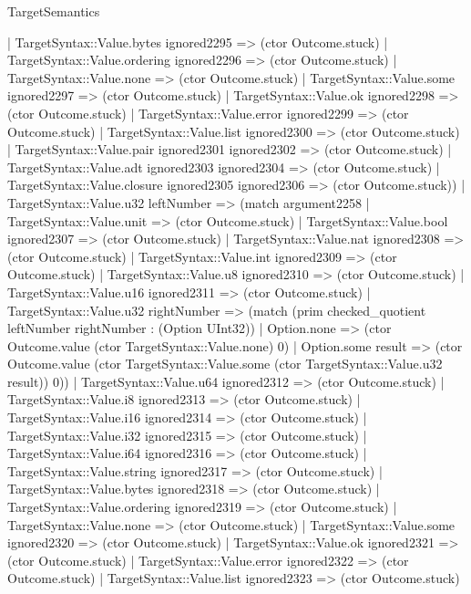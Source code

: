 \begin{lexlean}{TargetSemantics}
\begin{semanticmodule}
{              | TargetSyntax::Value.bytes ignored2295 => (ctor Outcome.stuck)
              | TargetSyntax::Value.ordering ignored2296 => (ctor Outcome.stuck)
              | TargetSyntax::Value.none => (ctor Outcome.stuck)
              | TargetSyntax::Value.some ignored2297 => (ctor Outcome.stuck)
              | TargetSyntax::Value.ok ignored2298 => (ctor Outcome.stuck)
              | TargetSyntax::Value.error ignored2299 => (ctor Outcome.stuck)
              | TargetSyntax::Value.list ignored2300 => (ctor Outcome.stuck)
              | TargetSyntax::Value.pair ignored2301 ignored2302 => (ctor Outcome.stuck)
              | TargetSyntax::Value.adt ignored2303 ignored2304 => (ctor Outcome.stuck)
              | TargetSyntax::Value.closure ignored2305 ignored2306 => (ctor Outcome.stuck))
            | TargetSyntax::Value.u32 leftNumber => (match argument2258
              | TargetSyntax::Value.unit => (ctor Outcome.stuck)
              | TargetSyntax::Value.bool ignored2307 => (ctor Outcome.stuck)
              | TargetSyntax::Value.nat ignored2308 => (ctor Outcome.stuck)
              | TargetSyntax::Value.int ignored2309 => (ctor Outcome.stuck)
              | TargetSyntax::Value.u8 ignored2310 => (ctor Outcome.stuck)
              | TargetSyntax::Value.u16 ignored2311 => (ctor Outcome.stuck)
              | TargetSyntax::Value.u32 rightNumber => (match (prim checked_quotient leftNumber rightNumber : (Option UInt32))
                | Option.none => (ctor Outcome.value (ctor TargetSyntax::Value.none) 0)
                | Option.some result => (ctor Outcome.value (ctor TargetSyntax::Value.some (ctor TargetSyntax::Value.u32 result)) 0))
              | TargetSyntax::Value.u64 ignored2312 => (ctor Outcome.stuck)
              | TargetSyntax::Value.i8 ignored2313 => (ctor Outcome.stuck)
              | TargetSyntax::Value.i16 ignored2314 => (ctor Outcome.stuck)
              | TargetSyntax::Value.i32 ignored2315 => (ctor Outcome.stuck)
              | TargetSyntax::Value.i64 ignored2316 => (ctor Outcome.stuck)
              | TargetSyntax::Value.string ignored2317 => (ctor Outcome.stuck)
              | TargetSyntax::Value.bytes ignored2318 => (ctor Outcome.stuck)
              | TargetSyntax::Value.ordering ignored2319 => (ctor Outcome.stuck)
              | TargetSyntax::Value.none => (ctor Outcome.stuck)
              | TargetSyntax::Value.some ignored2320 => (ctor Outcome.stuck)
              | TargetSyntax::Value.ok ignored2321 => (ctor Outcome.stuck)
              | TargetSyntax::Value.error ignored2322 => (ctor Outcome.stuck)
              | TargetSyntax::Value.list ignored2323 => (ctor Outcome.stuck)
}
\end{semanticmodule}
\end{lexlean}
